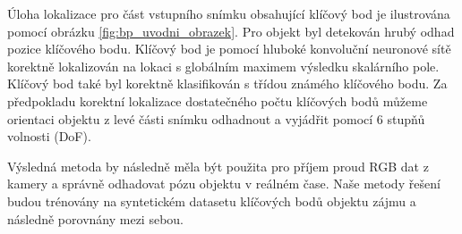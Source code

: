 Úloha lokalizace pro část vstupního snímku obsahující klíčový bod je ilustrována pomocí obrázku \ref{fig:bp_uvodni_obrazek}. Pro objekt byl detekován hrubý odhad pozice klíčového bodu. Klíčový bod je pomocí hluboké konvoluční neuronové sítě korektně lokalizován na lokaci s globálním maximem výsledku skalárního pole. Klíčový bod také byl korektně klasifikován s třídou známého klíčového bodu. Za předpokladu korektní lokalizace dostatečného počtu klíčových bodů můžeme orientaci objektu z levé části snímku odhadnout a vyjádřit pomocí 6 stupňů volnosti (DoF).

Výsledná metoda by následně měla být použita pro příjem proud RGB dat z kamery a správně odhadovat pózu objektu v reálném čase. Naše metody řešení budou trénovány na syntetickém datasetu klíčových bodů objektu zájmu a následně porovnány mezi sebou.
\endinput